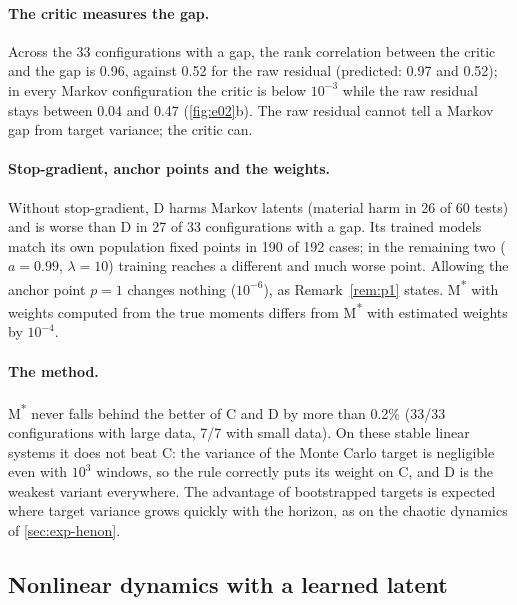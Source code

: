 \paragraph{The critic measures the gap.}
Across the 33 configurations with a gap, the rank correlation between the critic and the gap is 0.96, against 0.52 for the raw residual (predicted: 0.97 and 0.52); in every Markov configuration the critic is below $10^{-3}$ while the raw residual stays between 0.04 and 0.47 (\cref{fig:e02}b). The raw residual cannot tell a Markov gap from target variance; the critic can.

\paragraph{Stop-gradient, anchor points and the weights.}
Without stop-gradient, D harms Markov latents (material harm in 26 of 60 tests) and is worse than D in 27 of 33 configurations with a gap. Its trained models match its own population fixed points in 190 of 192 cases; in the remaining two ($a = 0.99$, $\lambda = 10$) training reaches a different and much worse point. Allowing the anchor point $p = 1$ changes nothing ($10^{-6}$), as Remark~\ref{rem:p1} states. M\textsuperscript{*} with weights computed from the true moments differs from M\textsuperscript{*} with estimated weights by $10^{-4}$.

\paragraph{The method.}
M\textsuperscript{*} never falls behind the better of C and D by more than 0.2\% (33/33 configurations with large data, 7/7 with small data). On these stable linear systems it does not beat C: the variance of the Monte Carlo target is negligible even with $10^3$ windows, so the rule correctly puts its weight on C, and D is the weakest variant everywhere. The advantage of bootstrapped targets is expected where target variance grows quickly with the horizon, as on the chaotic dynamics of \cref{sec:exp-henon}.

\subsection{Nonlinear dynamics with a learned latent}
\label{sec:exp-latent}

